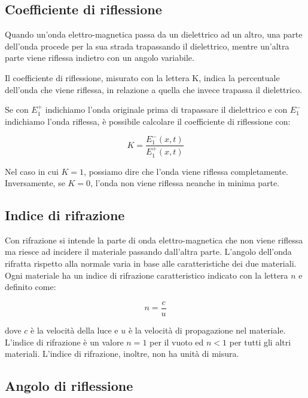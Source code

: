 \documentclass{article}
\begin{document}
    \subsection{Coefficiente di riflessione}

    Quando un'onda elettro-magnetica passa da un dielettrico ad un altro, una parte dell'onda procede per la sua strada
    trapassando il dielettrico, mentre un'altra parte viene riflessa indietro con un angolo variabile.

    Il coefficiente di riflessione, misurato con la lettera K, indica la percentuale dell'onda che viene riflessa, in relazione
    a quella che invece trapassa il dielettrico.

    Se con $E^+_1$ indichiamo l'onda originale prima di trapassare il dielettrico e con $E^-_1$ indichiamo l'onda riflessa,
    è possibile calcolare il coefficiente di riflessione con:

    \begin{equation}
        K = \frac{E^-_1(x,t)}{E^+_1(x,t)}
    \end{equation}

    Nel caso in cui $K = 1$, possiamo dire che l'onda viene riflessa completamente. Inversamente, se $K = 0$, l'onda non viene
    riflessa neanche in minima parte.

    \subsection{Indice di rifrazione}

    Con rifrazione si intende la parte di onda elettro-magnetica che non viene riflessa ma riesce ad incidere il materiale
    passando dall'altra parte. L'angolo dell'onda rifratta rispetto alla normale varia in base alle caratteristiche dei due
    materiali. Ogni materiale ha un indice di rifrazione caratteristico indicato con la lettera $n$ e definito come:

    \begin{equation}
        n = \frac{c}{u}
    \end{equation}

    dove $c$ è la velocità della luce e $u$ è la velocità di propagazione nel materiale. L'indice di rifrazione è un valore $n = 1$
    per il vuoto ed $n < 1$ per tutti gli altri materiali. L'indice di rifrazione, inoltre, non ha unità di misura.

    \subsection{Angolo di riflessione}
\end{document}
